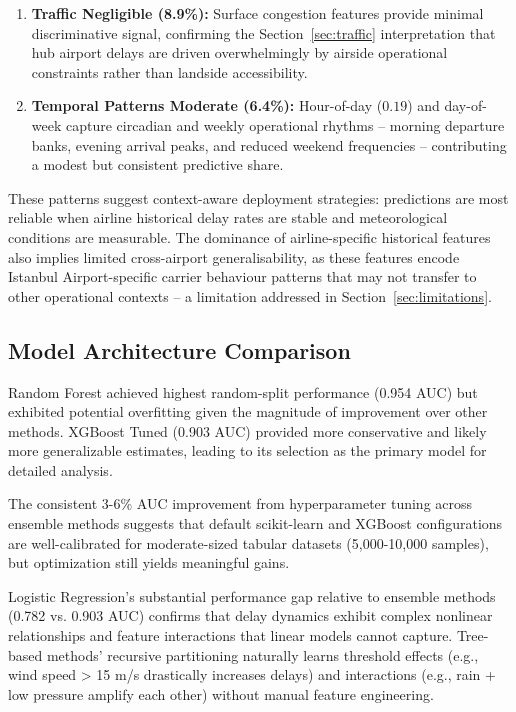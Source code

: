 \documentclass{report}
\begin{document}
\begin{enumerate}
\item \textbf{Traffic Negligible (8.9\%):}
Surface congestion features provide minimal discriminative signal, confirming
the Section~\ref{sec:traffic} interpretation that hub airport delays are driven
overwhelmingly by airside operational constraints rather than landside
accessibility.

\item \textbf{Temporal Patterns Moderate (6.4\%):}
Hour-of-day ($0.19$) and day-of-week capture circadian and weekly operational
rhythms -- morning departure banks, evening arrival peaks, and reduced weekend
frequencies -- contributing a modest but consistent predictive share.

\end{enumerate}

These patterns suggest context-aware deployment strategies: predictions are
most reliable when airline historical delay rates are stable and meteorological
conditions are measurable.  The dominance of airline-specific historical
features also implies limited cross-airport generalisability, as these features
encode Istanbul Airport-specific carrier behaviour patterns that may not
transfer to other operational contexts -- a limitation addressed in
Section~\ref{sec:limitations}.

\subsection{Model Architecture Comparison}

Random Forest achieved highest random-split performance (0.954 AUC) but exhibited potential overfitting given the magnitude of improvement over other methods. XGBoost Tuned (0.903 AUC) provided more conservative and likely more generalizable estimates, leading to its selection as the primary model for detailed analysis.

The consistent 3-6\% AUC improvement from hyperparameter tuning across ensemble methods suggests that default scikit-learn and XGBoost configurations are well-calibrated for moderate-sized tabular datasets (5,000-10,000 samples), but optimization still yields meaningful gains.

Logistic Regression's substantial performance gap relative to ensemble methods (0.782 vs. 0.903 AUC) confirms that delay dynamics exhibit complex nonlinear relationships and feature interactions that linear models cannot capture. Tree-based methods' recursive partitioning naturally learns threshold effects (e.g., wind speed > 15 m/s drastically increases delays) and interactions (e.g., rain + low pressure amplify each other) without manual feature engineering.
\end{document}

